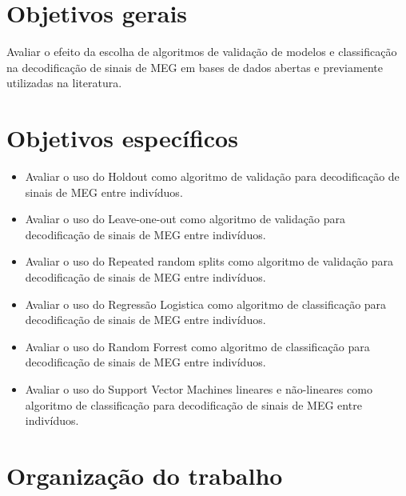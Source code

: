 \section{Objetivos gerais}
Avaliar o efeito da escolha de algoritmos de validação de modelos e classificação na decodificação de sinais de MEG em bases de dados abertas e previamente utilizadas na literatura.

\section{Objetivos específicos}
\begin{itemize}
\item Avaliar o uso do Holdout como algoritmo de validação para decodificação de sinais de MEG entre indivíduos.
\item Avaliar o uso do Leave-one-out como algoritmo de validação para decodificação de sinais de MEG entre indivíduos.
\item Avaliar o uso do Repeated random splits como algoritmo de validação para decodificação de sinais de MEG entre indivíduos.
\item Avaliar o uso do Regressão Logistica como algoritmo de classificação para decodificação de sinais de MEG entre indivíduos.
\item Avaliar o uso do Random Forrest como algoritmo de classificação para decodificação de sinais de MEG entre indivíduos.
\item Avaliar o uso do Support Vector Machines lineares e não-lineares como algoritmo de classificação para decodificação de sinais de MEG entre indivíduos.

\end{itemize}

\section{Organização do trabalho}

